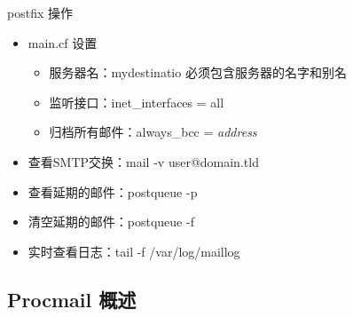 \begin{frame}{postfix 操作}
\begin{itemize}
\item main.cf 设置

\begin{itemize}
\item 服务器名：mydestinatio 必须包含服务器的名字和别名
\item 监听接口：inet\_interfaces = all
\item 归档所有邮件：always\_bcc = \emph{address}
\end{itemize}
\item 查看SMTP交换：mail -v user@domain.tld
\item 查看延期的邮件：postqueue -p
\item 清空延期的邮件：postqueue -f
\item 实时查看日志：tail -f /var/log/maillog
\end{itemize}

\end{frame} 
\subsection{Procmail 概述}

